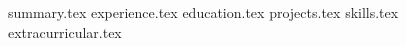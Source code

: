 \documentclass[11pt, a4paper]{awesome-cv}
\newcommand*{\sectiondir}{resume/}
\begin{document}
\makecvheader

{summary.tex}
{experience.tex}
{education.tex}
{projects.tex}
{skills.tex}
{extracurricular.tex}
\end{document}
